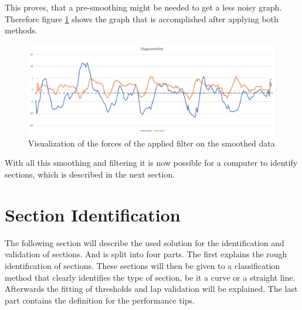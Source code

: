 This proves, that a pre-smoothing might be needed to get a less noisy graph. Therefore figure \ref{fig:sgFor} shows the graph that is accomplished after applying both methods.

\begin{figure}[H]
	\centering
	\includegraphics[scale= 0.45]{Pictures/sgForces.png}
	\caption{Visualization of the forces of the applied filter on the smoothed data}
	\label{fig:sgFor}
\end{figure}

With all this smoothing and filtering it is now possible for a computer to identify sections, which is described in the next section.

\newpage
\section{Section Identification}
The following section will describe the used solution for the identification and validation of sections. And is split into four parts. The first explains the rough identification of sections. These sections will then be given to a classification method that clearly identifies the type of section, be it a curve or a straight line. Afterwards the fitting of thresholds and lap validation will be explained. The last part contains the definition for the performance tips.

